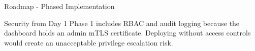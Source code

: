 \begin{frame}{Roadmap - Phased Implementation}
\begin{center}
  \end{center}

  \vspace{0.1cm}

  \begin{alertblock}{Security from Day 1}
    \scriptsize
    Phase 1 includes RBAC and audit logging because the dashboard holds an admin mTLS
    certificate. Deploying without access controls would create an unacceptable
    privilege escalation risk.
  \end{alertblock}
\end{frame}

